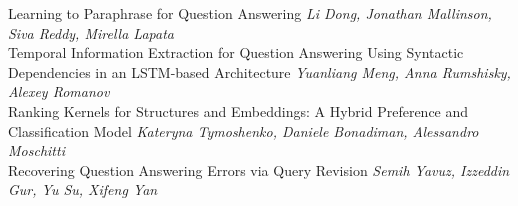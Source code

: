 \documentclass{book}
\begin{document}
    \noindent	Learning to Paraphrase for Question Answering \newline 
    {\itshape Li Dong, Jonathan Mallinson, Siva Reddy, Mirella Lapata} \\
    
    \noindent	Temporal Information Extraction for Question Answering Using Syntactic Dependencies in an LSTM-based Architecture \newline 
    {\itshape Yuanliang Meng, Anna Rumshisky, Alexey Romanov} \\
    
    \noindent	Ranking Kernels for Structures and Embeddings: A Hybrid Preference and Classification Model \newline 
    {\itshape Kateryna Tymoshenko, Daniele Bonadiman, Alessandro Moschitti} \\
    
    \noindent	Recovering Question Answering Errors via Query Revision \newline 
    {\itshape Semih Yavuz, Izzeddin Gur, Yu Su, Xifeng Yan} \\
    
\end{document}
